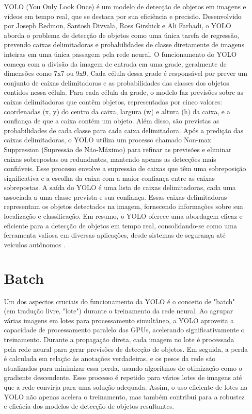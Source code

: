YOLO (You Only Look Once) é um modelo de detecção de objetos em imagens e vídeos em tempo real, que se destaca por sua eficiência e precisão. Desenvolvido por Joseph Redmon, Santosh Divvala, Ross Girshick e Ali Farhadi, o YOLO aborda o problema de detecção de objetos como uma única tarefa de regressão, prevendo caixas delimitadoras e probabilidades de classe diretamente de imagens inteiras em uma única passagem pela rede neural. O funcionamento do YOLO começa com a divisão da imagem de entrada em uma grade, geralmente de dimensões como 7x7 ou 9x9. Cada célula dessa grade é responsável por prever um conjunto de caixas delimitadoras e as probabilidades das classes dos objetos contidos nessa célula. Para cada célula da grade, o modelo faz previsões sobre as caixas delimitadoras que contêm objetos, representadas por cinco valores: coordenadas (x, y) do centro da caixa, largura (w) e altura (h) da caixa, e a confiança de que a caixa contém um objeto. Além disso, são previstas as probabilidades de cada classe para cada caixa delimitadora. Após a predição das caixas delimitadoras, o YOLO utiliza um processo chamado Non-max Suppression (Supressão de Não-Máximo) para refinar as previsões e eliminar caixas sobrepostas ou redundantes, mantendo apenas as detecções mais confiáveis. Esse processo envolve a supressão de caixas que têm uma sobreposição significativa e a escolha da caixa com a maior confiança entre as caixas sobrepostas. A saída do YOLO é uma lista de caixas delimitadoras, cada uma associada a uma classe prevista e sua confiança. Essas caixas delimitadoras representam os objetos detectados na imagem, fornecendo informações sobre sua localização e classificação. Em resumo, o YOLO oferece uma abordagem eficaz e eficiente para a detecção de objetos em tempo real, consolidando-se como uma ferramenta valiosa em diversas aplicações, desde sistemas de segurança até veículos autônomos \cite{redmon2016youlookonce}.


\section{Batch}
\label{sec:batch}

Um dos aspectos cruciais do funcionamento da YOLO é o conceito de "batch" (em tradução livre, "lote") durante o treinamento da rede neural. Ao agrupar várias imagens em lotes para processamento simultâneo, a YOLO aproveita a capacidade de processamento paralelo das GPUs, acelerando significativamente o treinamento. Durante a propagação direta, cada imagem no lote é processada pela rede neural para gerar previsões de detecção de objetos. Em seguida, a perda é calculada em relação às anotações verdadeiras, e os pesos da rede são atualizados para minimizar essa perda, usando algoritmos de otimização como o gradiente descendente. Esse processo é repetido para vários lotes de imagens até que a rede convirja para uma solução adequada. Assim, o uso eficiente de lotes na YOLO não apenas acelera o treinamento, mas também contribui para a robustez e eficácia dos modelos de detecção de objetos resultantes. \cite{goodfellow2016deep}

